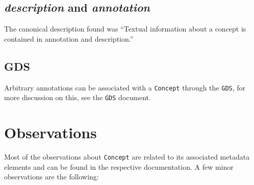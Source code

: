 \documentclass[a4paper,10pt]{article}
\newcommand{\field}[1]{\textit{#1}\xspace}
\newcommand{\term}[1]{\texttt{#1}\xspace}
\newcommand{\co}{\term{Concept}}
\begin{document}
\subsection{\field{description} and \field{annotation}}
The canonical description found was ``Textual information about a concept is contained in annotation and description.''

\subsection{GDS}
Arbitrary annotations can be associated with a \co through the \term{GDS}, for more discussion on this, see the \term{GDS} document.

\section{Observations}
Most of the observations about \co are related to its associated metadata elements and can be found in the respective documentation. A few minor observations are the following:
\end{document}

